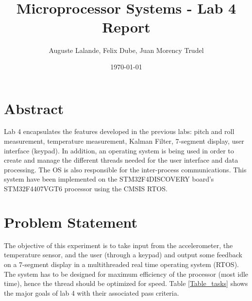 \documentclass[12pt]{article}
\title{Microprocessor Systems - Lab 4 Report}
\author{Auguste Lalande, Felix Dube, Juan Morency Trudel}
\date{\today}
\begin{document}
\maketitle
\clearpage

\tableofcontents
\clearpage

\section{Abstract}
Lab 4 encapsulates the features developed in the previous labs: pitch and roll measurement, temperature measurement, Kalman Filter, 7-segment display, user interface (keypad). In addition, an operating system is being used in order to create and manage the different threads needed for the user interface and data processing. The OS is also responsible for the inter-process communications. This system have been implemented on the STM32F4DISCOVERY board’s STM32F4407VGT6 processor using the CMSIS RTOS.

\section{Problem Statement}
The objective of this experiment is to take input from the accelerometer, the temperature sensor, and the user (through a keypad) and output some feedback on a 7-segment display in a multithreaded real time operating system (RTOS). The system has to be designed for maximum efficiency of the processor (most idle time), hence the thread should be optimized for speed. Table \ref{Table_tasks} shows the major goals of lab 4 with their associated pass criteria.
\end{document}
